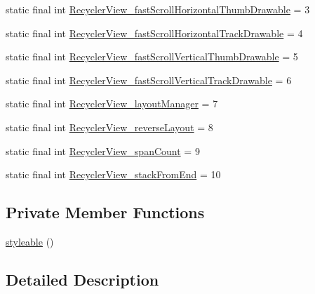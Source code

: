 \begin{DoxyCompactItemize}
\item 
static final int \mbox{\hyperlink{classandroid_1_1support_1_1v7_1_1recyclerview_1_1_r_1_1styleable_a342ef035db2dd2e3fcc37eb649e2897d}{Recycler\+View\+\_\+fast\+Scroll\+Horizontal\+Thumb\+Drawable}} = 3
\item 
static final int \mbox{\hyperlink{classandroid_1_1support_1_1v7_1_1recyclerview_1_1_r_1_1styleable_a6c4ba53e66e2c39e6a6d6431e1454269}{Recycler\+View\+\_\+fast\+Scroll\+Horizontal\+Track\+Drawable}} = 4
\item 
static final int \mbox{\hyperlink{classandroid_1_1support_1_1v7_1_1recyclerview_1_1_r_1_1styleable_a555375d32c5ee971ea05f3ee1dd761b9}{Recycler\+View\+\_\+fast\+Scroll\+Vertical\+Thumb\+Drawable}} = 5
\item 
static final int \mbox{\hyperlink{classandroid_1_1support_1_1v7_1_1recyclerview_1_1_r_1_1styleable_ad508a344c0275d0f96680a841ac3ac9e}{Recycler\+View\+\_\+fast\+Scroll\+Vertical\+Track\+Drawable}} = 6
\item 
static final int \mbox{\hyperlink{classandroid_1_1support_1_1v7_1_1recyclerview_1_1_r_1_1styleable_ade58ca5f3c9266666ecba3450b58cb66}{Recycler\+View\+\_\+layout\+Manager}} = 7
\item 
static final int \mbox{\hyperlink{classandroid_1_1support_1_1v7_1_1recyclerview_1_1_r_1_1styleable_a41b8dce4d149422b23cc47d6ed94d093}{Recycler\+View\+\_\+reverse\+Layout}} = 8
\item 
static final int \mbox{\hyperlink{classandroid_1_1support_1_1v7_1_1recyclerview_1_1_r_1_1styleable_aa2ba7ea9d22cc1e759e2e397da74d906}{Recycler\+View\+\_\+span\+Count}} = 9
\item 
static final int \mbox{\hyperlink{classandroid_1_1support_1_1v7_1_1recyclerview_1_1_r_1_1styleable_a027b5b2a3c1e9c19e9cb33da79eed6dc}{Recycler\+View\+\_\+stack\+From\+End}} = 10
\end{DoxyCompactItemize}
\subsection*{Private Member Functions}
\begin{DoxyCompactItemize}
\item 
\mbox{\hyperlink{classandroid_1_1support_1_1v7_1_1recyclerview_1_1_r_1_1styleable_ad06444ba5c95f395a367b92507d6a747}{styleable}} ()
\end{DoxyCompactItemize}


\subsection{Detailed Description}


